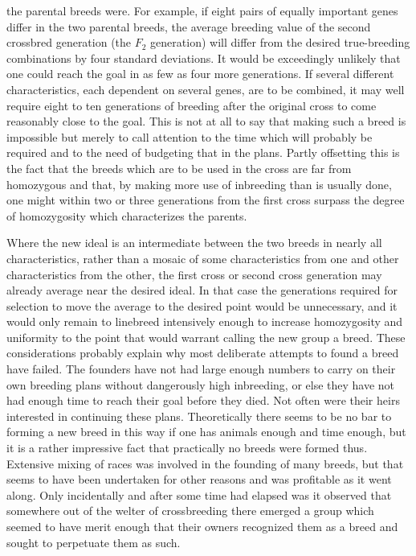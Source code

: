 the parental breeds were. For example, if eight pairs of equally
important genes differ in the two parental breeds, the average breeding
value of the second crossbred generation (the $F_2$ generation) will differ
from the desired true-breeding combinations by four standard deviations.
It would be exceedingly unlikely that one could reach the goal in
as few as four more generations. If several different characteristics, each
dependent on several genes, are to be combined, it may well require
eight to ten generations of breeding after the original cross to come
reasonably close to the goal. This is not at all to say that making such a
breed is impossible but merely to call attention to the time which will
probably be required and to the need of budgeting that in the plans.
Partly offsetting this is the fact that the breeds which are to be used in
the cross are far from homozygous and that, by making more use of
inbreeding than is usually done, one might within two or three generations
from the first cross surpass the degree of homozygosity which
characterizes the parents.

Where the new ideal is an intermediate between the two breeds in
nearly all characteristics, rather than a mosaic of some characteristics
from one and other characteristics from the other, the first cross or second
cross generation may already average near the desired ideal. In that
case the generations required for selection to move the average to the
desired point would be unnecessary, and it would only remain to linebreed
intensively enough to increase homozygosity and uniformity to
the point that would warrant calling the new group a breed. These considerations
probably explain why most deliberate attempts to found a
breed have failed. The founders have not had large enough numbers to
carry on their own breeding plans without dangerously high inbreeding,
or else they have not had enough time to reach their goal before
they died. Not often were their heirs interested in continuing these
plans. Theoretically there seems to be no bar to forming a new breed in
this way if one has animals enough and time enough, but it is a rather
impressive fact that practically no breeds were formed thus. Extensive
mixing of races was involved in the founding of many breeds, but that
seems to have been undertaken for other reasons and was profitable as
it went along. Only incidentally and after some time had elapsed was
it observed that somewhere out of the welter of crossbreeding there
emerged a group which seemed to have merit enough that their owners
recognized them as a breed and sought to perpetuate them as such.

